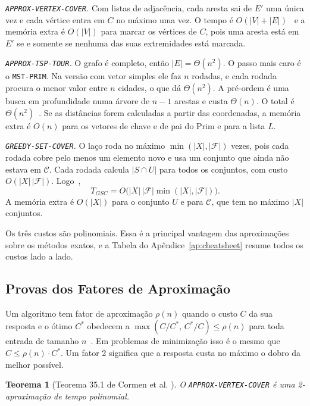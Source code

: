 \documentclass[conference]{IEEEtran}
\theoremstyle{definition}
\theoremstyle{plain}
\newtheorem{teorema}{Teorema}
\begin{document}
\textit{\texttt{APPROX-VERTEX-COVER}.} Com listas de adjacência, cada aresta sai de $E'$ uma única vez e cada vértice entra em $C$ no máximo uma vez. O tempo é $O(|V| + |E|)$~\cite{cormen2012algoritmos} e a memória extra é $O(|V|)$ para marcar os vértices de $C$, pois uma aresta está em $E'$ se e somente se nenhuma das suas extremidades está marcada.

\textit{\texttt{APPROX-TSP-TOUR}.} O grafo é completo, então $|E| = \Theta(n^2)$. O passo mais caro é o \texttt{MST-PRIM}. Na versão com vetor simples ele faz $n$ rodadas, e cada rodada procura o menor valor entre $n$ cidades, o que dá $\Theta(n^2)$. A pré-ordem é uma busca em profundidade numa árvore de $n-1$ arestas e custa $\Theta(n)$. O total é $\Theta(n^2)$~\cite{cormen2012algoritmos}. Se as distâncias forem calculadas a partir das coordenadas, a memória extra é $O(n)$ para os vetores de chave e de pai do Prim e para a lista $L$.

\textit{\texttt{GREEDY-SET-COVER}.} O laço roda no máximo $\min(|X|, |\mathcal{F}|)$ vezes, pois cada rodada cobre pelo menos um elemento novo e usa um conjunto que ainda não estava em $\mathcal{C}$. Cada rodada calcula $|S \cap U|$ para todos os conjuntos, com custo $O(|X|\,|\mathcal{F}|)$. Logo~\cite{cormen2012algoritmos},
\begin{equation}
T_{GSC} = O\big(|X|\,|\mathcal{F}| \min(|X|, |\mathcal{F}|)\big).
\end{equation}
A memória extra é $O(|X|)$ para o conjunto $U$ e para $\mathcal{C}$, que tem no máximo $|X|$ conjuntos.

Os três custos são polinomiais. Essa é a principal vantagem das aproximações sobre os métodos exatos, e a Tabela do Apêndice~\ref{ap:cheatsheet} resume todos os custos lado a lado.

\subsection{Provas dos Fatores de Aproximação}

Um algoritmo tem fator de aproximação $\rho(n)$ quando o custo $C$ da sua resposta e o ótimo $C^*$ obedecem a $\max(C/C^*,\, C^*/C) \le \rho(n)$ para toda entrada de tamanho $n$~\cite{cormen2012algoritmos}. Em problemas de minimização isso é o mesmo que $C \le \rho(n) \cdot C^*$. Um fator 2 significa que a resposta custa no máximo o dobro da melhor possível.

\begin{teorema}[Teorema 35.1 de Cormen et al. \cite{cormen2012algoritmos}]
\label{teo:approx_vc}
O \texttt{APPROX-VERTEX-COVER} é uma 2-aproximação de tempo polinomial.
\end{teorema}
\end{document}
